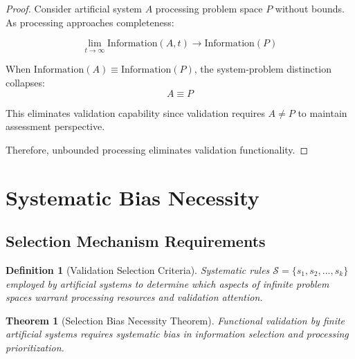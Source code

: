 \documentclass[12pt,a4paper]{article}
\newtheorem{theorem}{Theorem}
\newtheorem{definition}{Definition}
\begin{document}
\begin{proof}
Consider artificial system $A$ processing problem space $P$ without bounds. As processing approaches completeness:

$$\lim_{t \to \infty} \text{Information}(A, t) \to \text{Information}(P)$$

When $\text{Information}(A) \equiv \text{Information}(P)$, the system-problem distinction collapses:
$$A \equiv P$$

This eliminates validation capability since validation requires $A \neq P$ to maintain assessment perspective.

Therefore, unbounded processing eliminates validation functionality.
\end{proof}

\section{Systematic Bias Necessity}

\subsection{Selection Mechanism Requirements}

\begin{definition}[Validation Selection Criteria]
Systematic rules $\mathcal{S} = \{s_1, s_2, ..., s_k\}$ employed by artificial systems to determine which aspects of infinite problem spaces warrant processing resources and validation attention.
\end{definition}

\begin{theorem}[Selection Bias Necessity Theorem]
Functional validation by finite artificial systems requires systematic bias in information selection and processing prioritization.
\end{theorem}
\end{document}
